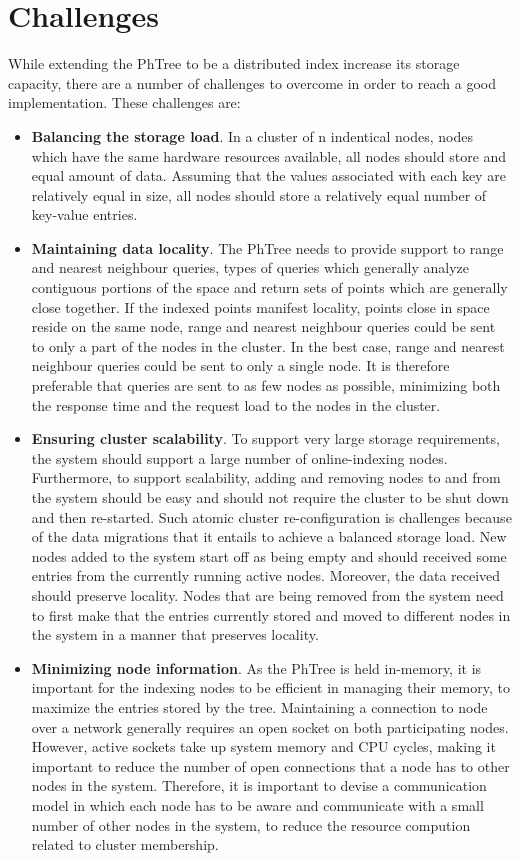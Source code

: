 \documentclass[11pt,a4paper]{globis-book}
\begin{document}
\section{Challenges}
\label{sec:distindex-challenges}

While extending the PhTree to be a distributed index increase its storage capacity, there are a number of challenges to overcome in order to reach a good implementation. These challenges are:
\begin{itemize}
    \item \textbf{Balancing the storage load}. In a cluster of n indentical nodes, nodes which have the same hardware resources available, all nodes should store and equal amount of data. Assuming that the values associated with each key are relatively equal in size, all nodes should store a relatively equal number of key-value entries.
    \item \textbf{Maintaining data locality}. The PhTree needs to provide support to range and nearest neighbour queries, types of queries which generally analyze contiguous portions of the space and return sets of points which are generally close together. If the indexed points manifest locality, points close in space reside on the same node, range and nearest neighbour queries could be sent to only a part of the nodes in the cluster. In the best case, range and nearest neighbour queries could be sent to only a single node. It is therefore preferable that queries are sent to as few nodes as possible, minimizing both the response time and the request load to the nodes in the cluster.
    \item \textbf{Ensuring cluster scalability}. To support very large storage requirements, the system should support a large number of online-indexing nodes. Furthermore, to support scalability, adding and removing nodes to and from the system should be easy and should not require the cluster to be shut down and then re-started. Such atomic cluster re-configuration is challenges because of the data migrations that it entails to achieve a balanced storage load. New nodes added to the system start off as being empty and should received some entries from the currently running active nodes. Moreover, the data received should preserve locality. Nodes that are being removed from the system need to first make that the entries currently stored and moved to different nodes in the system in a manner that preserves locality. 
    \item \textbf{Minimizing node information}. As the PhTree is held in-memory, it is important for the indexing nodes to be efficient in managing their memory, to maximize the entries stored by the tree. Maintaining a connection to node over a network generally requires an open socket on both participating nodes. However, active sockets take up system memory and CPU cycles, making it important to reduce the number of open connections that a node has to other nodes in the system. Therefore, it is important to devise a communication model in which each node has to be aware and communicate with a small number of other nodes in the system, to reduce the resource compution related to cluster membership.
\end{itemize}
\end{document}
